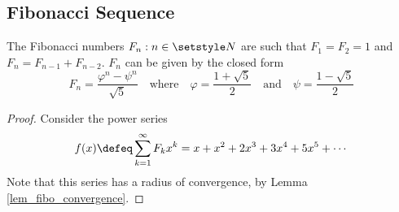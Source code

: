\subsection{Fibonacci Sequence}

\begin{theorem}
 The Fibonacci numbers \(F_n: n \in \Naturals\) are such that
 \(F_1 = F_2 = 1\) and \(F_n = F_{n - 1} + F_{n - 2}\).  \(F_n\) can be given
 by the closed form
 \begin{equation*}
  F_n = \frac{\varphi^n - \psi^n}{\sqrt 5}
  \quad \text{where}\quad \varphi = \frac{1 + \sqrt 5} 2
  \quad \text{and}\quad \psi = \frac{1 - \sqrt 5} 2
 \end{equation*}
\end{theorem}
\begin{proof}
 Consider the power series
 \begin{equation*}
  f(x) \defeq \sum_{k=1}^\infty F_k x^k = x + x^2 + 2x^3 + 3x^4 + 5x^5
      + \dotsb
 \end{equation*}
 Note that this series has a radius of convergence, by Lemma
 \ref{lem_fibo_convergence}.


\end{proof}
